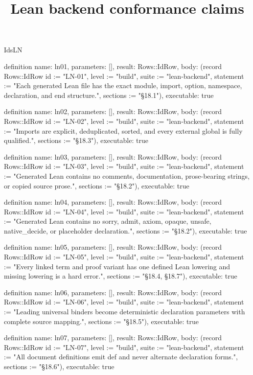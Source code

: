 \begin{lexlean}{IdsLN}
\title{Lean backend conformance claims}
\begin{semanticmodule}
definition{
  name: ln01,
  parameters: [],
  result: Rows::IdRow,
  body: (record Rows::IdRow {id := "LN-01", level := "build", suite := "lean-backend", statement := "Each generated Lean file has the exact module, import, option, namespace, declaration, and end structure.", sections := "§18.1"}),
  executable: true
}

definition{
  name: ln02,
  parameters: [],
  result: Rows::IdRow,
  body: (record Rows::IdRow {id := "LN-02", level := "build", suite := "lean-backend", statement := "Imports are explicit, deduplicated, sorted, and every external global is fully qualified.", sections := "§18.3"}),
  executable: true
}

definition{
  name: ln03,
  parameters: [],
  result: Rows::IdRow,
  body: (record Rows::IdRow {id := "LN-03", level := "build", suite := "lean-backend", statement := "Generated Lean contains no comments, documentation, prose-bearing strings, or copied source prose.", sections := "§18.2"}),
  executable: true
}

definition{
  name: ln04,
  parameters: [],
  result: Rows::IdRow,
  body: (record Rows::IdRow {id := "LN-04", level := "build", suite := "lean-backend", statement := "Generated Lean contains no sorry, admit, axiom, opaque, unsafe, native_decide, or placeholder declaration.", sections := "§18.2"}),
  executable: true
}

definition{
  name: ln05,
  parameters: [],
  result: Rows::IdRow,
  body: (record Rows::IdRow {id := "LN-05", level := "build", suite := "lean-backend", statement := "Every linked term and proof variant has one defined Lean lowering and missing lowering is a hard error.", sections := "§18.4, §18.7"}),
  executable: true
}

definition{
  name: ln06,
  parameters: [],
  result: Rows::IdRow,
  body: (record Rows::IdRow {id := "LN-06", level := "build", suite := "lean-backend", statement := "Leading universal binders become deterministic declaration parameters with complete source mapping.", sections := "§18.5"}),
  executable: true
}

definition{
  name: ln07,
  parameters: [],
  result: Rows::IdRow,
  body: (record Rows::IdRow {id := "LN-07", level := "build", suite := "lean-backend", statement := "All document definitions emit def and never alternate declaration forms.", sections := "§18.6"}),
  executable: true
}


\end{semanticmodule}
\end{lexlean}

